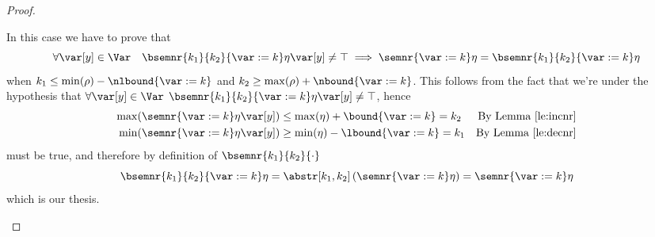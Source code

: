 \begin{proof}
\begin{inductive}
     In this case we have to prove that
    \begin{equation*}
      \forall \var[y] \in \Var \quad {\bsemnr{k_1}{k_2}{\var := k}\eta\var[y] \neq \top}
      \implies
      {\semnr{\var := k}\eta} = {\bsemnr{k_1}{k_2}{\var := k}\eta}
    \end{equation*}
    when \(k_1 \leq \min(\rho) - \nlbound{\var := k}\) and
    \(k_2 \geq \max(\rho) + \nbound{\var := k}\). %
    This follows from the fact that we're under the hypothesis that
    \(\forall \var[y]\in\Var\)
    \(\bsemnr{k_1}{k_2}{\var:= k}\eta\var[y]\neq\top\), hence
    \begin{align*}
      \max(\semnr{\var:= k}\eta\var[y]) & \leq \max(\eta) + \bound{\var := k} = k_2  & \text{By Lemma~\ref{le:incnr}}\\
      \min(\semnr{\var:= k}\eta\var[y]) & \geq \min(\eta) - \lbound{\var := k} = k_1 & \text{By Lemma~\ref{le:decnr}}
    \end{align*}
    must be true, and therefore by definition of
    \(\bsemnr{k_1}{k_2}{\cdot}\)
    \begin{equation*}
      \bsemnr{k_1}{k_2}{\var := k}\eta = \abstr[k_1,k_2]\left(\semnr{\var := k}\eta\right) = \semnr{\var := k}\eta
    \end{equation*}
    which is our thesis.


\end{inductive}
\end{proof}
